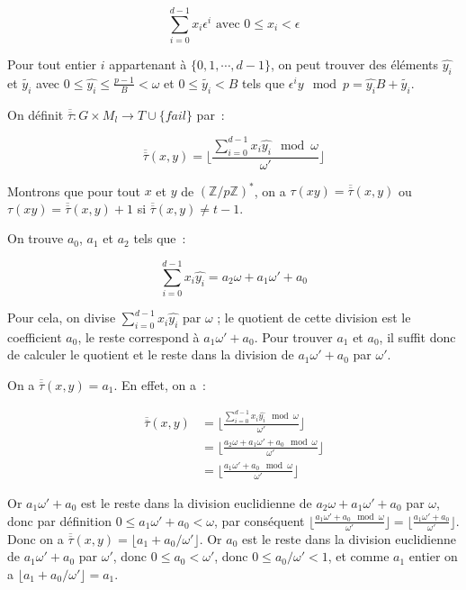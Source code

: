     $$ \sum_{i=0}^{d-1} x_i \epsilon^i \text{ avec $0 \leq x_i < \epsilon$} $$

    Pour tout entier $i$ appartenant à $\{0,1,\cdots,d-1\}$, on peut trouver des éléments $\hat{y_i}$ et $\tilde{y_i}$ avec $0 \leq \hat{y_i} \leq \frac{p-1}{B} < \omega$ et $0 \leq \tilde{y_i} < B$ tels que $\epsilon^i y\mod p = \hat{y_i} B + \tilde{y_i}$.

    On définit $\overline{\overline{\tau}} : G \times M_l \longrightarrow T \cup \{fail\}$ par~:

    $$\overline{\overline{\tau}}(x,y) = \lfloor \frac{\sum_{i=0}^{d-1} x_i \hat{y_i}\mod \omega}{\omega'} \rfloor$$

    Montrons que pour tout $x$ et $y$ de $(\mathbb{Z}/p\mathbb{Z})^*$, on a $\tau(xy) = \overline{\overline{\tau}}(x,y)$ ou $\tau(xy) = \overline{\overline{\tau}}(x,y) + 1$ si $\overline{\overline{\tau}}(x,y) \neq t - 1$.

    On trouve $a_0$, $a_1$ et $a_2$ tels que~:

    $$ \sum_{i=0}^{d-1} x_i \hat{y_i} = a_2\omega + a_1\omega' + a_0 $$

    Pour cela, on divise $\sum_{i=0}^{d-1} x_i \hat{y_i}$ par $\omega$ ; le quotient de cette division est le coefficient $a_0$, le reste correspond à $a_1\omega' + a_0$. Pour trouver $a_1$ et $a_0$, il suffit donc de calculer le quotient et le reste dans la division de $a_1\omega' + a_0$ par $\omega'$.

    On a $\overline{\overline{\tau}}(x,y) = a_1$. En effet, on a~:

    \begin{align*}
    \overline{\overline{\tau}}(x,y) &= \lfloor \frac{\sum_{i=0}^{d-1} x_i \hat{y_i}\mod \omega}{\omega'} \rfloor \\
                                    &= \lfloor \frac{a_2\omega + a_1\omega' + a_0\mod \omega}{\omega'} \rfloor \\
                                    &= \lfloor \frac{a_1\omega' + a_0\mod \omega}{\omega'} \rfloor
    \end{align*}

    Or $a_1\omega' + a_0$ est le reste dans la division euclidienne de $a_2\omega + a_1\omega' + a_0$ par $\omega$, donc par définition $0 \leq a_1\omega' + a_0 <  \omega$, par conséquent $\lfloor \frac{a_1\omega' + a_0\mod \omega}{\omega'} \rfloor = \lfloor \frac{a_1\omega' + a_0}{\omega'} \rfloor$. Donc on a $\overline{\overline{\tau}}(x,y) = \lfloor a_1 + a_0/\omega' \rfloor$. Or $a_0$ est le reste dans la division euclidienne de $a_1\omega' + a_0$ par $\omega'$, donc $0 \leq a_0 < \omega'$, donc $0 \leq a_0/\omega' < 1$, et comme $a_1$ entier on a $\lfloor a_1 + a_0/\omega' \rfloor = a_1$.

